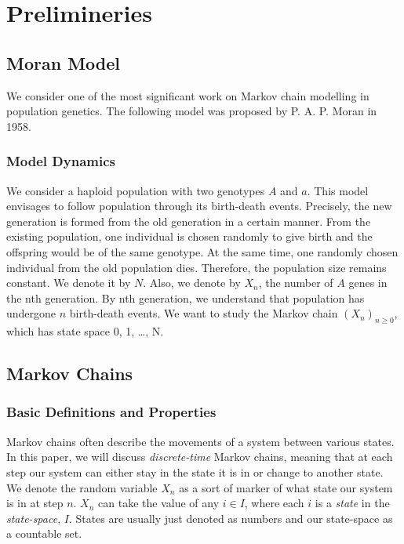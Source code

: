 \chapter{Prelimineries}
\section{Moran Model}
We consider one of the most significant work on Markov chain modelling in population genetics. The following model was proposed by P. A. P. Moran in 1958.
\subsection{Model Dynamics}
We consider a haploid population with two genotypes $A$ and $a$. This model envisages to follow population through its birth-death events. Precisely, the new generation is formed from the old generation in a certain manner.
\newline
From the existing population, one individual is chosen randomly to give birth and the offspring would be of the same genotype. At the same time, one randomly chosen individual from the old population dies. Therefore, the population size remains constant. We denote it by $N$. Also, we denote by $X_{n}$, the number of $A$ genes in the nth generation. By nth generation, we understand that population has undergone $n$ birth-death events. We want to study the Markov chain $(X_{n})_{n\geq0}$, which has state space {0, 1, \ldots, N}.
\section{Markov Chains}
\subsection{Basic Definitions and Properties}

Markov chains often describe the movements of a system between various states. In this paper, we will discuss \emph{discrete-time} Markov chains, meaning that at each step our system can either stay in the state it is in or change to another state. We denote the random variable $X_n$ as a sort of marker of what state our system is in at step $n$. $X_n$ can take the value of any $i \in I$, where each $i$ is a \emph{state} in the \emph{state-space}, $I$. States are usually just denoted as numbers and our state-space as a countable set.

